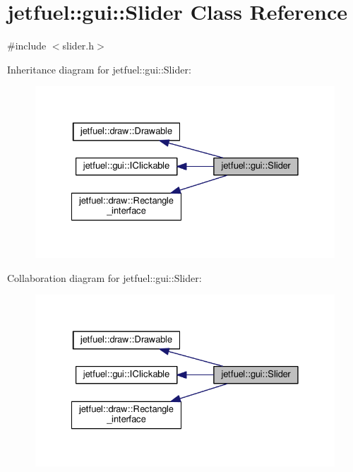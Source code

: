 \hypertarget{classjetfuel_1_1gui_1_1Slider}{}\section{jetfuel\+:\+:gui\+:\+:Slider Class Reference}
\label{classjetfuel_1_1gui_1_1Slider}


{\ttfamily \#include $<$slider.\+h$>$}



Inheritance diagram for jetfuel\+:\+:gui\+:\+:Slider\+:\nopagebreak
\begin{figure}[H]
\begin{center}
\leavevmode
\includegraphics[width=328pt]{classjetfuel_1_1gui_1_1Slider__inherit__graph}
\end{center}
\end{figure}


Collaboration diagram for jetfuel\+:\+:gui\+:\+:Slider\+:\nopagebreak
\begin{figure}[H]
\begin{center}
\leavevmode
\includegraphics[width=328pt]{classjetfuel_1_1gui_1_1Slider__coll__graph}
\end{center}
\end{figure}
